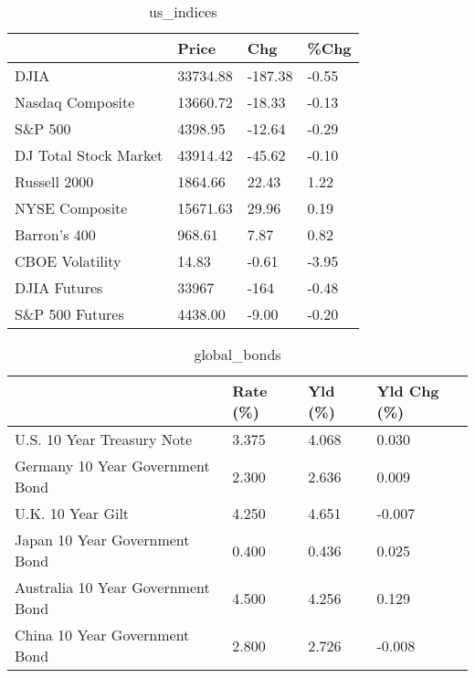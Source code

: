 \documentclass{article}%
\begin{document}
%


\begin{table}[htbp]%
\caption{us\_indices}%
\centering%
\begin{adjustbox}{width=1\textwidth}%
\begin{tabular}{llll}
\toprule
                      &    Price &     Chg &  \%Chg \\
\midrule
                 DJIA & 33734.88 & -187.38 & -0.55 \\
     Nasdaq Composite & 13660.72 &  -18.33 & -0.13 \\
              S\&P 500 &  4398.95 &  -12.64 & -0.29 \\
DJ Total Stock Market & 43914.42 &  -45.62 & -0.10 \\
         Russell 2000 &  1864.66 &   22.43 &  1.22 \\
       NYSE Composite & 15671.63 &   29.96 &  0.19 \\
         Barron's 400 &   968.61 &    7.87 &  0.82 \\
      CBOE Volatility &    14.83 &   -0.61 & -3.95 \\
         DJIA Futures &    33967 &    -164 & -0.48 \\
      S\&P 500 Futures &  4438.00 &   -9.00 & -0.20 \\
\bottomrule
\end{tabular}
%
\end{adjustbox}%
\end{table}

%


\begin{table}[htbp]%
\caption{global\_bonds}%
\centering%
\begin{adjustbox}{width=1\textwidth}%
\begin{tabular}{llll}
\toprule
                                  & Rate (\%) & Yld (\%) & Yld Chg (\%) \\
\midrule
       U.S. 10 Year Treasury Note &    3.375 &   4.068 &       0.030 \\
  Germany 10 Year Government Bond &    2.300 &   2.636 &       0.009 \\
                U.K. 10 Year Gilt &    4.250 &   4.651 &      -0.007 \\
    Japan 10 Year Government Bond &    0.400 &   0.436 &       0.025 \\
Australia 10 Year Government Bond &    4.500 &   4.256 &       0.129 \\
    China 10 Year Government Bond &    2.800 &   2.726 &      -0.008 \\
\bottomrule
\end{tabular}
%
\end{adjustbox}%
\end{table}
\end{document}
